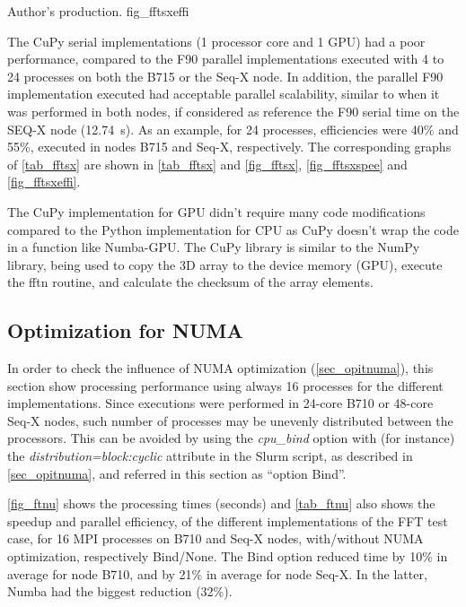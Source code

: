      {Author's production.} {fig_fftsxeffi}

The CuPy serial implementations (1 processor core and 1 GPU) had a poor performance, compared to the F90 parallel implementations executed with 4 to 24 processes on both the B715 or the Seq-X node. In addition, the parallel F90 implementation executed had acceptable parallel scalability, similar to when it was performed in both nodes, if considered as reference the F90 serial time on the SEQ-X node (12.74~s). As an example, for 24 processes, efficiencies were 40\% and 55\%, executed in nodes B715 and Seq-X, respectively. The corresponding graphs of \autoref {tab_fftsx} are shown in \autoref {tab_fftsx} and \autoref {fig_fftsx}, \autoref {fig_fftsxspee} and \autoref {fig_fftsxeffi}.

The CuPy implementation for GPU didn't require many code modifications compared to the Python implementation for CPU as CuPy doesn't wrap the code in a function like Numba-GPU. The CuPy library is similar to the NumPy library, being used to copy the 3D array to the device memory (GPU), execute the fftn routine, and calculate the checksum of the array elements.

%
%
%
\subsection{Optimization for NUMA}
\label{sec_fftnuma}

In order to check the influence of NUMA optimization (\autoref {sec_opitnuma}), this section show processing performance using always 16 processes for the different implementations. Since executions were performed in 24-core B710 or 48-core Seq-X nodes, such number of processes may be unevenly distributed between the processors. This can be avoided by using the \textit {cpu\_bind} option with (for instance) the \textit {distribution=block:cyclic} attribute in the Slurm script, as described in \autoref {sec_opitnuma}, and referred in this section as ``option Bind''.

\autoref {fig_ftnu} shows the processing times (seconds) and \autoref {tab_ftnu} also shows the speedup and parallel efficiency, of the different implementations of the FFT test case, for 16 MPI processes on B710 and Seq-X nodes, with/without NUMA optimization, respectively Bind/None. The Bind option reduced time by 10\% in average for node B710, and by 21\% in average for node Seq-X. In the latter, Numba had the biggest reduction (32\%).

